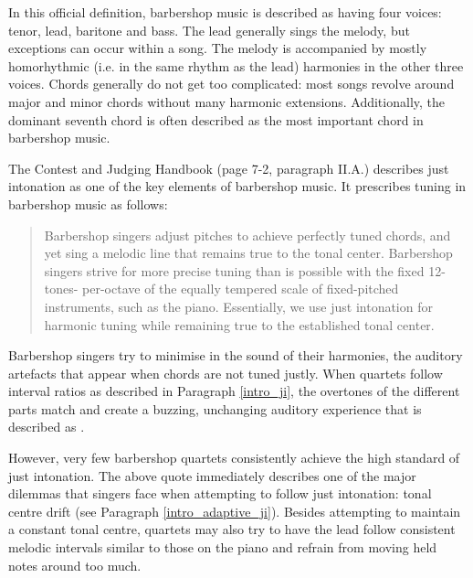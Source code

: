 \documentclass[a4paper]{article}
\begin{document}
In this official definition, barbershop music is described as having four voices: tenor, lead, baritone and bass. The lead generally sings the melody, but exceptions can occur within a song. The melody is accompanied by mostly homorhythmic (i.e. in the same rhythm as the lead) harmonies in the other three voices. Chords generally do not get too complicated: most songs revolve around major and minor chords without many harmonic extensions. \cite{barbershop_harmony_society_contest_2022} Additionally, the dominant seventh chord is often described as the most important chord in barbershop music. \cite{averill_bell_1999}

The Contest and Judging Handbook (page 7-2, paragraph II.A.) \cite{barbershop_harmony_society_contest_2022} describes just intonation as one of the key elements of barbershop music. It prescribes tuning in barbershop music as follows:
\begin{quote}
	Barbershop singers adjust pitches to achieve perfectly tuned chords, and yet sing a melodic line that remains true to the tonal center. Barbershop singers strive for more precise tuning than is possible with the fixed 12-tones- per-octave of the equally tempered scale of fixed-pitched instruments, such as the piano. Essentially, we use just intonation for harmonic tuning while remaining true to the established tonal center.
\end{quote}
Barbershop singers try to minimise  in the sound of their harmonies, the auditory artefacts that appear when chords are not tuned justly. When quartets follow interval ratios as described in Paragraph \ref{intro_ji}, the overtones of the different parts match and create a buzzing, unchanging auditory experience that is described as .

However, very few barbershop quartets consistently achieve the high standard of just intonation. \cite{garnett_ethics_1999} The above quote immediately describes one of the major dilemmas that singers face when attempting to follow just intonation: tonal centre drift (see Paragraph \ref{intro_adaptive_ji}). Besides attempting to maintain a constant tonal centre, quartets may also try to have the lead follow consistent melodic intervals similar to those on the piano \cite{barbershop_harmony_society_contest_2022} and refrain from moving held notes around too much.
\end{document}
